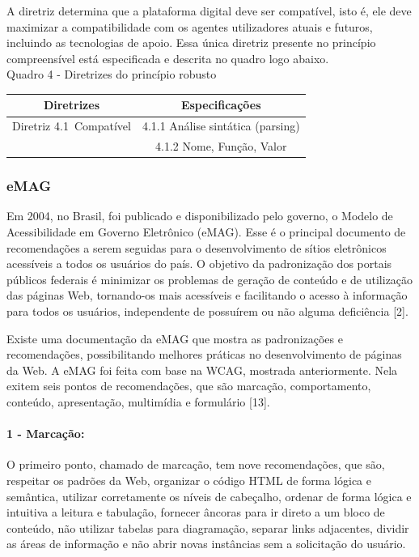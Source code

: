 \documentclass[a4paper]{article}
\begin{document}
\begin{titlepage}
A diretriz determina que a plataforma digital deve ser compatível, isto é, ele deve maximizar a compatibilidade com os agentes utilizadores atuais e futuros, incluindo as tecnologias de apoio. Essa única diretriz presente no princípio compreensível está especificada e descrita no quadro logo abaixo.\\

Quadro 4 - Diretrizes do princípio robusto\\[-1cm]
\begin{center}
	\begin{longtable}{|c|c|}
		\hline
		Diretrizes & Especificações \\
		\hline
		Diretriz 4.1 Compatível& 4.1.1 Análise sintática (parsing)\\
		& 4.1.2 Nome, Função, Valor\\
		\hline
	\end{longtable}
\end{center}

\subsubsection{eMAG}

Em 2004, no Brasil, foi publicado e disponibilizado pelo governo, o Modelo de Acessibilidade em Governo Eletrônico (eMAG). Esse é o principal documento de recomendações a serem seguidas para o desenvolvimento de sítios eletrônicos acessíveis a todos os usuários do país. O objetivo da padronização dos portais públicos federais é minimizar os problemas de geração de conteúdo e de utilização das páginas Web, tornando-os mais acessíveis e facilitando o acesso à informação para todos os usuários, independente de possuírem ou não alguma deficiência [2].

Existe uma documentação da eMAG que mostra as padronizações e recomendações, possibilitando melhores práticas no desenvolvimento de páginas da Web. A eMAG foi feita com base na WCAG, mostrada anteriormente. Nela exitem seis pontos de recomendações, que são marcação, comportamento, conteúdo, apresentação, multimídia e formulário [13].

\paragraph{1 - Marcação: }

O primeiro ponto, chamado de marcação, tem nove recomendações, que são, respeitar os padrões da Web, organizar o código HTML de forma lógica e semântica, utilizar corretamente os níveis de cabeçalho, ordenar de forma lógica e intuitiva a leitura e tabulação, fornecer âncoras para ir direto a um bloco de conteúdo, não utilizar tabelas para diagramação, separar links adjacentes, dividir as áreas de informação e não abrir novas instâncias sem a solicitação do usuário.


\end{titlepage}
\end{document}
